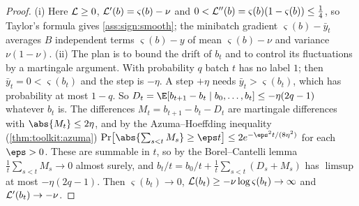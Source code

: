 \begin{refsection}

\begin{proof}
(i) Here $\mathcal{L}\ge0$, $\mathcal{L}'(b)=\varsigma(b)-\nu$ and $0<\mathcal{L}''(b)=\varsigma(b)(1-\varsigma(b))\le\frac14$, so Taylor's formula gives \cref{ass:sign:smooth}; the minibatch gradient $\varsigma(b)-\bar y_t$ averages $B$ independent terms $\varsigma(b)-y$ of mean $\varsigma(b)-\nu$ and variance $\nu(1-\nu)$.
(ii) The plan is to bound the drift of $b_t$ and to control its fluctuations by a martingale argument. With probability $q$ batch $t$ has no label $1$; then $\bar y_t=0<\varsigma(b_t)$ and the step is $-\eta$. A step $+\eta$ needs $\bar y_t>\varsigma(b_t)$, which has probability at most $1-q$. So $D_t=\E[b_{t+1}-b_t\mid b_0,\dots,b_t]\le-\eta(2q-1)$ whatever $b_t$ is. The differences $M_t=b_{t+1}-b_t-D_t$ are martingale differences with $\abs{M_t}\le2\eta$, and by the Azuma--Hoeffding inequality (\cref{thm:toolkit:azuma}) $\Pr\bigl[\abs{\sum_{s<t}M_s}\ge\eps t\bigr]\le2e^{-\eps^2t/(8\eta^2)}$ for each $\eps>0$. These are summable in $t$, so by the Borel--Cantelli lemma $\frac1t\sum_{s<t}M_s\to0$ almost surely, and $b_t/t=b_0/t+\frac1t\sum_{s<t}(D_s+M_s)$ has $\limsup$ at most $-\eta(2q-1)$. Then $\varsigma(b_t)\to0$, $\mathcal{L}(b_t)\ge-\nu\log\varsigma(b_t)\to\infty$ and $\mathcal{L}'(b_t)\to-\nu$.
\end{proof}


\end{refsection}
